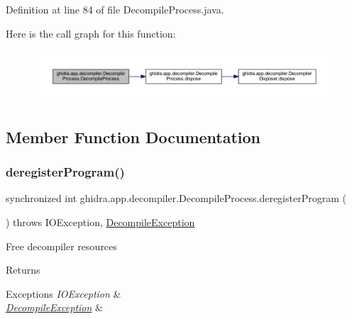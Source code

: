 Definition at line 84 of file Decompile\+Process.\+java.

Here is the call graph for this function\+:
\nopagebreak
\begin{figure}[H]
\begin{center}
\leavevmode
\includegraphics[width=350pt]{classghidra_1_1app_1_1decompiler_1_1_decompile_process_a1d87e3793a82ac3421528f78ce195b17_cgraph}
\end{center}
\end{figure}


\subsection{Member Function Documentation}
\mbox{\label{classghidra_1_1app_1_1decompiler_1_1_decompile_process_a0f33c60970b4db8f9f42d31623cd91c9}} 
\subsubsection{\texorpdfstring{deregisterProgram()}{deregisterProgram()}}
{\footnotesize\ttfamily synchronized int ghidra.\+app.\+decompiler.\+Decompile\+Process.\+deregister\+Program (\begin{DoxyParamCaption}{ }\end{DoxyParamCaption}) throws I\+O\+Exception, \mbox{\hyperlink{classghidra_1_1app_1_1decompiler_1_1_decompile_exception}{Decompile\+Exception}}\hspace{0.3cm}{\ttfamily [inline]}}

Free decompiler resources \begin{DoxyReturn}{Returns}

\end{DoxyReturn}

\begin{DoxyExceptions}{Exceptions}
{\em I\+O\+Exception} & \\
\hline
{\em \mbox{\hyperlink{classghidra_1_1app_1_1decompiler_1_1_decompile_exception}{Decompile\+Exception}}} & \\
\hline
\end{DoxyExceptions}


